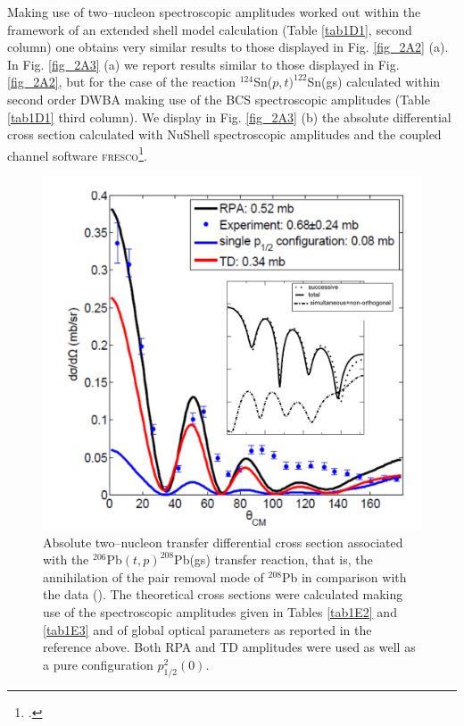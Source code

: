  Making use of two--nucleon spectroscopic amplitudes worked out within the framework of an extended shell model calculation (Table \ref{tab1D1}, second column) one obtains very similar results to those displayed in Fig. \ref{fig_2A2} (a). In Fig. \ref{fig_2A3} (a) we report results similar to those displayed in Fig. \ref{fig_2A2}, but for the case of the reaction $^{124}$Sn($p,t)^{122}$Sn(gs) calculated within second order DWBA making use of the BCS spectroscopic amplitudes (Table \ref{tab1D1} third column). We display in Fig. \ref{fig_2A3} (b)  the absolute differential cross section calculated with NuShell spectroscopic amplitudes and the coupled channel software \textsc{fresco}\footnote{\cite{Thompson:13}.}.



    \begin{figure}
    \centerline{\includegraphics*[width=\textwidth,angle=0]{nutshell/figs/tp_Pb_contributions.pdf}}
    \caption{Absolute two--nucleon transfer differential cross section associated with the $^{206}$Pb$(t,p)^{208}$Pb(gs) transfer reaction, that is, the annihilation of the pair removal mode of $^{208}$Pb in comparison with the data (\cite{Bjerregaard:66b}). The theoretical cross sections were calculated making use of the spectroscopic amplitudes given in Tables \ref{tab1E2} and \ref{tab1E3} and of global optical parameters as reported in the reference above. Both  RPA and TD amplitudes were used as well as a pure configuration $p_{1/2}^2(0)$.}\label{fig2A4}
    \end{figure}

